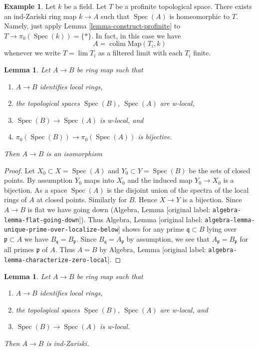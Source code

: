 \documentclass[10pt,a4paper]{article}
\theoremstyle{plain}
\newtheorem{lemma}[subsection]{Lemma}
\theoremstyle{definition}
\newtheorem{example}[subsection]{Example}
\theoremstyle{remark}
\numberwithin{equation}{subsection}
\def\lim{\mathop{\mathrm{lim}}\nolimits}
\def\colim{\mathop{\mathrm{colim}}\nolimits}
\def\Spec{\mathop{\mathrm{Spec}}}
\begin{document}
\begin{example}
\label{example-construct-space}
Let $k$ be a field. Let $T$ be a profinite topological space.
There exists an ind-Zariski ring map $k \to A$ such that
$\Spec(A)$ is homeomorphic to $T$. Namely, just apply
Lemma \ref{lemma-construct-profinite} to $T \to \pi_0(\Spec(k)) = \{*\}$.
In fact, in this case we have
$$
A = \colim \text{Map}(T_i, k)
$$
whenever we write $T = \lim T_i$ as a filtered limit with each $T_i$ finite.
\end{example}

\begin{lemma}
\label{lemma-w-local-morphism-equal-points-stalks-is-iso}
Let $A \to B$ be ring map such that
\begin{enumerate}
\item $A \to B$ identifies local rings,
\item the topological spaces $\Spec(B)$, $\Spec(A)$ are w-local,
\item $\Spec(B) \to \Spec(A)$ is w-local, and
\item $\pi_0(\Spec(B)) \to \pi_0(\Spec(A))$ is bijective.
\end{enumerate}
Then $A \to B$ is an isomorphism
\end{lemma}

\begin{proof}
Let $X_0 \subset X = \Spec(A)$ and $Y_0 \subset Y = \Spec(B)$ be the
sets of closed points. By assumption $Y_0$ maps into $X_0$ and
the induced map $Y_0 \to X_0$ is a bijection.
As a space $\Spec(A)$ is the disjoint union of the spectra
of the local rings of $A$ at closed points.
Similarly for $B$. Hence $X \to Y$ is a bijection.
Since $A \to B$ is flat we have going down
(Algebra, Lemma \textnormal{[original label: \nolinkurl{algebra-lemma-flat-going-down}]}).
Thus Algebra, Lemma \textnormal{[original label: \nolinkurl{algebra-lemma-unique-prime-over-localize-below}]}
shows for any prime $\mathfrak q \subset B$ lying over
$\mathfrak p \subset A$ we have $B_\mathfrak q = B_\mathfrak p$.
Since $B_\mathfrak q = A_\mathfrak p$ by assumption, we
see that $A_\mathfrak p = B_\mathfrak p$ for all primes $\mathfrak p$
of $A$. Thus $A = B$ by
Algebra, Lemma \textnormal{[original label: \nolinkurl{algebra-lemma-characterize-zero-local}]}.
\end{proof}

\begin{lemma}
\label{lemma-w-local-morphism-equal-stalks-is-ind-zariski}
Let $A \to B$ be ring map such that
\begin{enumerate}
\item $A \to B$ identifies local rings,
\item the topological spaces $\Spec(B)$, $\Spec(A)$ are w-local, and
\item $\Spec(B) \to \Spec(A)$ is w-local.
\end{enumerate}
Then $A \to B$ is ind-Zariski.
\end{lemma}
\end{document}
